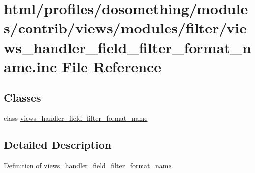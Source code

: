 \hypertarget{views__handler__field__filter__format__name_8inc}{
\section{html/profiles/dosomething/modules/contrib/views/modules/filter/views\_\-handler\_\-field\_\-filter\_\-format\_\-name.inc File Reference}
\label{views__handler__field__filter__format__name_8inc}
}
\subsection*{Classes}
\begin{DoxyCompactItemize}
\item 
class \hyperlink{classviews__handler__field__filter__format__name}{views\_\-handler\_\-field\_\-filter\_\-format\_\-name}
\end{DoxyCompactItemize}


\subsection{Detailed Description}
Definition of \hyperlink{classviews__handler__field__filter__format__name}{views\_\-handler\_\-field\_\-filter\_\-format\_\-name}. 